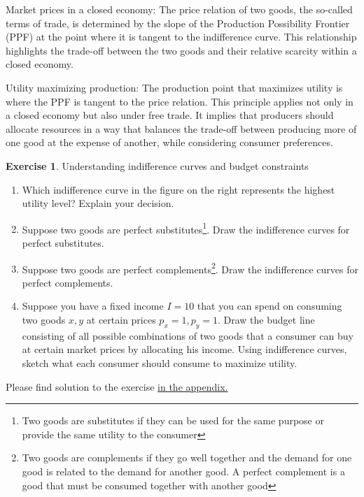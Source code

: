 \documentclass[
  12pt,
  oneside]{book}
\providecommand{\tightlist}{%
  \setlength{\itemsep}{0pt}\setlength{\parskip}{0pt}}
\theoremstyle{definition}
\theoremstyle{definition}
\theoremstyle{definition}
\newtheorem{exercise}{Exercise}[chapter]
\theoremstyle{definition}
\theoremstyle{remark}
\begin{document}
Market prices in a closed economy:
The price relation of two goods, the so-called terms of trade, is determined by the slope of the Production Possibility Frontier (PPF) at the point where it is tangent to the indifference curve. This relationship highlights the trade-off between the two goods and their relative scarcity within a closed economy.

Utility maximizing production:
The production point that maximizes utility is where the PPF is tangent to the price relation. This principle applies not only in a closed economy but also under free trade. It implies that producers should allocate resources in a way that balances the trade-off between producing more of one good at the expense of another, while considering consumer preferences.

\begin{exercise}
\protect\hypertarget{exr:Uic}{}\label{exr:Uic}Understanding indifference curves and budget constraints

\begin{enumerate}
\def\labelenumi{\alph{enumi})}
\tightlist
\item
  Which indifference curve in the figure on the right represents the highest utility level? Explain your decision.
\item
  Suppose two goods are perfect substitutes\footnote{Two goods are substitutes if they can be used for the same purpose or provide the same utility to the consumer}. Draw the indifference curves for perfect substitutes.
\item
  Suppose two goods are perfect complements\footnote{Two goods are complements if they go well together and the demand for one good is related to the demand for another good. A perfect complement is a good that must be consumed together with another good}. Draw the indifference curves for perfect complements.
\item
  Suppose you have a fixed income \(I=10\) that you can spend on consuming two goods \(x, y\) at certain prices \(p_x=1, p_y=1\). Draw the budget line consisting of all possible combinations of two goods that a consumer can buy at certain market prices by allocating his income. Using indifference curves, sketch what each consumer should consume to maximize utility.
\end{enumerate}

Please find solution to the exercise \protect\hyperlink{sol:Uic}{in the appendix.}
\end{exercise}
\end{document}
